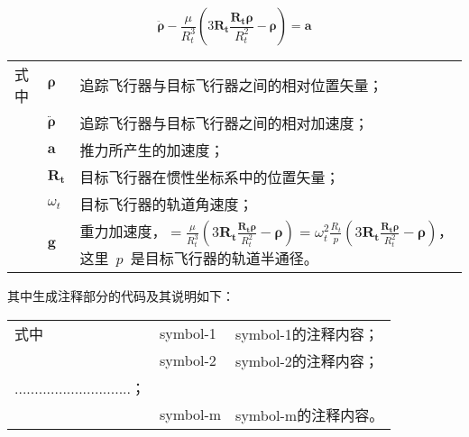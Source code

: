 \begin{equation}
\label{eq:1}
\ddot{\symbf{\rho}}-\frac{\mu}{R_t^3}\left(3\symbf{R_t}\frac{\symbf{R_t\rho}}{R_t^2}-\symbf{\rho}\right)=\symbf{a}
\end{equation}
\begin{flushleft}
\renewcommand\arraystretch{1.25}
\begin{tabularx}{\textwidth}{@{}>{\normalsize\rm}l@{\quad}>{\normalsize\rm}l@{\pozhehao }>{\normalsize\rm}X@{}}
式中& $\symbf{\rho}$ &追踪飞行器与目标飞行器之间的相对位置矢量；\\
&  $\ddot{\symbf{\rho}}$&追踪飞行器与目标飞行器之间的相对加速度；\\
&  $\symbf{a}$   &推力所产生的加速度；\\
&  $\symbf{R_t}$ & 目标飞行器在惯性坐标系中的位置矢量；\\
&  $\omega_{t}$ & 目标飞行器的轨道角速度；\\
&  $\symbf{g}$ & 重力加速度，$=\frac{\mu}{R_{t}^{3}}\left(
3\symbf{R_{t}}\frac{\symbf{R_{t}\rho}}{R_{t}^{2}}-\symbf{\rho}\right)=\omega_{t}^{2}\frac{R_{t}}{p}\left(
3\symbf{R_{t}}\frac{\symbf{R_{t}\rho}}{R_{t}^{2}}-\symbf{\rho}\right)$，这里~$p$~是目标飞行器的轨道半通径。
\end{tabularx}\vspace{.5ex}%
\end{flushleft}


其中生成注释部分的代码及其说明如下：
\begin{code}
\begin{tabularx}{\textwidth}{@{}l@{\quad}l@{\pozhehao}X@{}}
式中 & symbol-1 & symbol-1的注释内容；\\
     & symbol-2 & symbol-2的注释内容；\\
     .............................；\\
     & symbol-m & symbol-m的注释内容。
\end{tabularx}
\end{code}

